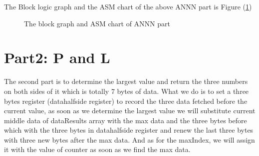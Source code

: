 \documentclass[11pt,a4paper]{report}
\begin{document}
The Block logic graph and the ASM chart of the above ANNN part is Figure ({\ref{TeamA ANNN}}) 

\begin{figure}[htbp]
    \centering
    \quad
    \caption{The block graph and ASM chart of ANNN part\label{TeamA ANNN}}
\end{figure}


\section{Part2: P and L}
\label{sec:P and L}

The second part is to determine the largest value and return the three numbers on both sides of it which is totally
 7 bytes of data. What we do is to set a three bytes register (datahalfside register) to record the three data 
 fetched before the current value, as soon as we determine the largest value we will substitute current middle 
 data of dataResults array with the max data and the three bytes before which with the three bytes in datahalfside 
 register and renew the last three bytes with three new bytes after the max data. And as for the maxIndex, we will
  assign it with the value of counter as soon as we find the max data.
\end{document}
